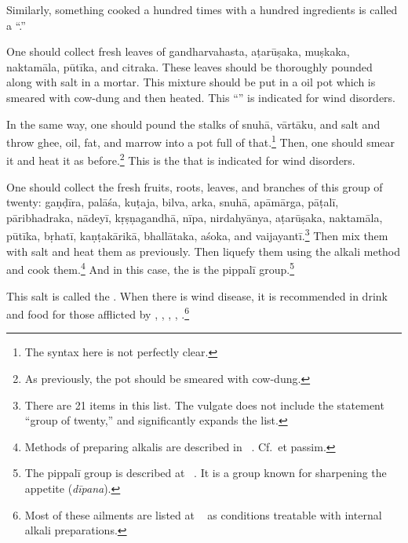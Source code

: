 \begin{translation}
Similarly, something cooked a hundred times with a hundred ingredients
is called a “.”\label{satapaka}



    \item[30] 
    
One should collect fresh leaves of \gls{gandharvahasta},
\gls{aṭarūṣaka}, \gls{muṣkaka}, \gls{naktamāla}, \gls{pūtīka}, and
\gls{citraka}. These leaves should be thoroughly pounded along with
salt in a mortar. This mixture should be put in a oil pot which is 
smeared with cow-dung and then heated.  This 
“” is indicated for wind disorders.

 
\item[31]
    
In the same way, one should pound the stalks of \gls{snuhā},
\gls{vārtāku}, and salt and throw ghee, oil, fat, and marrow into a
pot full of that.\footnote{The syntax here is not perfectly clear.}
Then, one should smear it and heat it as before.\footnote{As
    previously, the pot should be smeared with cow-dung.} This  is the
     that is indicated for wind disorders.

    
    \item[32] 
    
One should collect the fresh fruits, roots, leaves, and
branches of this group of twenty: 
%
\gls{gaṇḍīra}, 
\gls{palāśa},
\gls{kuṭaja}, 
\gls{bilva}, 
\gls{arka}, 
\gls{snuhā}, 
\gls{apāmārga},
\gls{pāṭalī}, 
\gls{pāribhadraka}, 
\gls{nādeyī}, 
\gls{kṛṣṇagandhā},
\gls{nīpa}, 
\gls{nirdahyānya}, 
\gls{aṭarūṣaka},
\gls{naktamāla}, 
\gls{pūtīka}, 
\gls{bṛhatī}, 
\gls{kaṇṭakārikā},
\gls{bhallātaka}, 
\gls{aśoka}, and 
\gls{vaijayantī}.\footnote{There are 21 items in 
    this list.  The vulgate does not include the statement “group of twenty,” 
    and significantly expands the list.}
%
Then mix them with salt and heat them as previously. Then liquefy
 them using the alkali method and cook them.\footnote{Methods of preparing 
 alkalis are described in \SS\ .  Cf.\,  
  et passim.} 
  And in this case, the  is the \gls{pippalī} 
  group.\footnote{The \gls{pippalī} group is described at \SS\ 
  .  It is a group known for sharpening the 
      appetite (\emph{dīpana}).}

This salt is called the .  
When there is wind disease, it is recommended in drink and food for those 
afflicted 
by , 
,
,
,
.\footnote{Most of these ailments are listed at \SS\ 
 as conditions treatable with internal alkali preparations.}



\end{translation}
